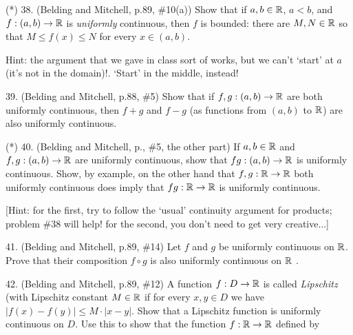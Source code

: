 \documentclass[12pt]{article}
\begin{document}
\begin{description}


\item{(*) 38.} (Belding and Mitchell, p.89, \#10(a)) Show that if $a,b\in{\mathbb R}$, $a<b$, 
and $f:(a,b)\rightarrow{\mathbb R}$ is {\it uniformly} continuous,
then $f$ is bounded: there are $M,N\in{\mathbb R}$ so that $M\leq f(x)\leq N$ for every $x\in (a,b)$.

\ssk

\item{\spc} Hint: the argument that we gave in class sort of works, but we can't `start' at
$a$ (it's not in the domain)!. `Start' in the middle, instead!

\msk

\item{39.} (Belding and Mitchell, p.88, \#5) Show that if $f,g:(a,b)\rightarrow{\mathbb R}$ are both uniformly
continuous, then $f+g$ and $f-g$ (as functions from $(a,b)$ to ${\mathbb R}$) are also uniformly continuous.

\msk

\item{(*) 40.} (Belding and Mitchell, p., \#5, the other part) 
If $a,b\in{\mathbb R}$ and $f,g:(a,b)\rightarrow{\mathbb R}$ are uniformly continuous, show that $fg:(a,b)\rightarrow{\mathbb R}$ is uniformly
continuous. Show, by example, on the other hand that $f,g:{\mathbb R}\rightarrow{\mathbb R}$ both uniformly continuous
does  imply that $fg:{\mathbb R}\rightarrow{\mathbb R}$ is uniformly continuous.

\ssk

\item{\spc} [Hint: for the first, try to follow the `usual' continuity argument for products; problem \#38 will
help! for the second, you don't need to get very creative...]

\msk

\item{41.} (Belding and Mitchell, p.89, \#14) Let $f$ and $g$ be uniformly continuous on ${\mathbb R}$. Prove that their 
composition $f\circ g$ is also uniformly continuous on ${\mathbb R}$ .
 
\msk

\item{42.} (Belding and Mitchell, p.89, \#12) A function $f:D\rightarrow{\mathbb R}$ is called {\it Lipschitz} (with Lipschitz
constant $M\in{\mathbb R}$ if for every $x,y\in D$ we have $|f(x)-f(y)|\leq M\cdot|x-y|$. Show that a Lipschitz function 
is uniformly continuous on $D$. Use this to show that the function $f:{\mathbb R}\rightarrow{\mathbb R}$ defined by

\ssk



\end{description}
\end{document}
